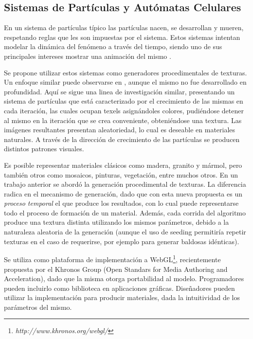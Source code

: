 
\subsection{Sistemas de Partículas y Autómatas Celulares}
En un sistema de part\'iculas \cite{Reeves1983} t\'ipico las part\'iculas nacen, se desarrollan y mueren, respetando reglas que les son impuestas por el sistema. Estos sistemas intentan modelar la din\'amica del fen\'omeno a trav\'es del tiempo, siendo uno de sus principales intereses mostrar una animaci\'on del mismo \cite{Gao2010, Bagar2010, Lentine2010}.

Se propone utilizar estos sistemas como generadores procedimentales de texturas. Un enfoque similar puede observarse en \cite{Kranidotis98}, aunque el mismo no fue desarrollado en profundidad.
Aquí se sigue una linea de investigaci\'on similar, presentando un sistema de part\'iculas que est\'a caracterizado por el crecimiento de las mismas en cada iteraci\'on, las cuales ocupan texels asign\'andoles colores, pudi\'endose detener al mismo en la iteraci\'on que se crea conveniente, obteni\'endose una textura.
Las im\'agenes resultantes presentan aleatoriedad, lo cual es deseable en materiales naturales.
A trav\'es de la direcci\'on de crecimiento de las part\'iculas se producen distintos patrones visuales.

Es posible representar materiales cl\'asicos como madera, granito y m\'armol, pero tambi\'en otros como mosaicos, pinturas, vegetaci\'on, entre muchos otros.
En un trabajo anterior \cite{Baravalle2010} se abord\'o la generaci\'on procedimental de texturas.
La diferencia radica en el mecanismo de generaci\'on, dado que con esta nueva propuesta es un {\em proceso temporal} el que produce los resultados, con lo cual puede representarse todo el proceso de formaci\'on de un material.
Adem\'as, cada corrida del algoritmo produce una textura distinta utilizando los mismos par\'ametros, debido a la naturaleza aleatoria de la generaci\'on (aunque el uso de seeding permitir\'ia repetir texturas en el caso de requerirse, por ejemplo para generar baldosas id\'enticas).

Se utiliza como plataforma de implementaci\'on a WebGL\footnote{\em http://www.khronos.org/webgl/}, recientemente propuesta por el Khronos Group (Open Standars for Media Authoring and Acceleration), dado que la misma otorga portabilidad al modelo. 
Programadores pueden incluirlo como biblioteca en aplicaciones gr\'aficas.
Dise\~nadores pueden utilizar la implementaci\'on para producir materiales, dada la intuitividad de los par\'ametros del mismo.

